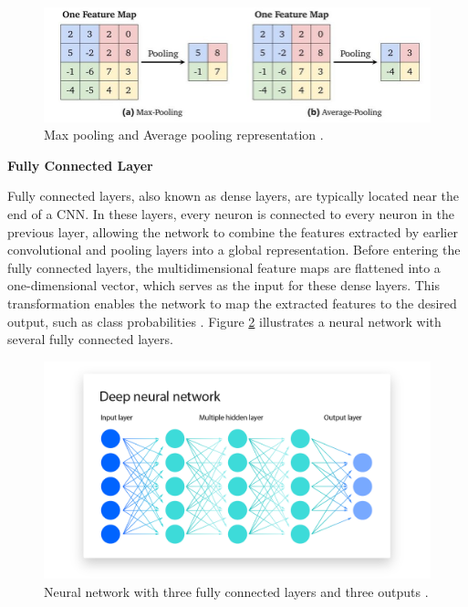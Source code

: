 \documentclass[a4paper,10pt]{book}
\begin{document}
\begin{figure}[h!]
    \centering
    \includegraphics[width=1.0\linewidth]{reports//assets/pooling.png}
    \caption[Popular pooling operations]{Max pooling and Average pooling representation \cite{SkinLesionClassification}.}
    \label{fig:pooling_operations}
\end{figure}

\textbf{Fully Connected Layer}

Fully connected layers, also known as dense layers, are typically located near the end of a CNN. In these layers, every neuron is connected to every neuron in the previous layer, allowing the network to combine the features extracted by earlier convolutional and pooling layers into a global representation. Before entering the fully connected layers, the multidimensional feature maps are flattened into a one-dimensional vector, which serves as the input for these dense layers. This transformation enables the network to map the extracted features to the desired output, such as class probabilities \cite{noauthor_fully_nodate}. Figure \ref{fig:fc_layers} illustrates a neural network with several fully connected layers.

\begin{figure}[h!]
    \centering
    \includegraphics[width=0.75\linewidth]{reports//assets/fc_network.png}
    \caption[Fully connected layers]{Neural network with three fully connected layers and three outputs \cite{bergmann_what_2024}.}
    \label{fig:fc_layers}
\end{figure}
\end{document}

